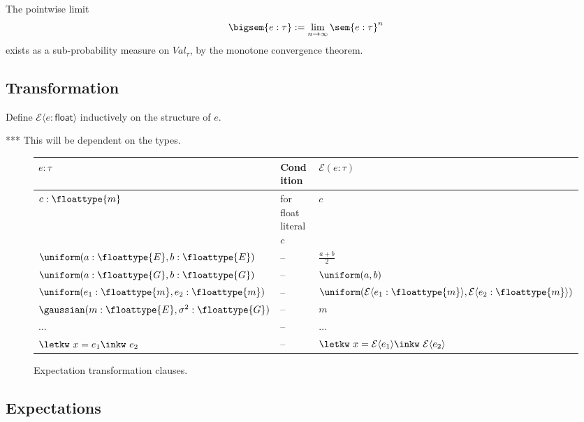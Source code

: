 \begin{lemma}
  The pointwise limit
  \[
    \bigsem{e : \tau} := \lim_{n \to \infty} \sem{e : \tau}^n
  \]
  exists as a sub-probability measure on $Val_\tau$, by the monotone convergence theorem.
\end{lemma}

\subsection{Transformation}

\begin{definition}
  Define $\mathcal{E}\langle e : \mathsf{float} \rangle$ inductively on the structure of $e$.

  *** This will be dependent on the types.

  \begin{figure}[t]
    \footnotesize
    \centering
    \begin{tabular}{l|l|l}
      \textbf{$e:\tau$} & \textbf{Condition} & \textbf{$\mathcal{E}(e:\tau)$} \\
      \hline
      $c : \floattype{m}$ &
      for float literal $c$ &
      $c$ \\
      $\uniform(a : \floattype{E}, b : \floattype{E})$ &
      -- &
      $\tfrac{a+b}{2}$ \\
      $\uniform(a : \floattype{G}, b : \floattype{G})$ &
      -- &
      $\uniform(a, b)$ \\
      $\uniform(e_1 : \floattype{m}, e_2 : \floattype{m})$ &
      -- &
      $\uniform(\mathcal{E}\langle e_1 : \floattype{m} \rangle, \mathcal{E}\langle e_2 : \floattype{m} \rangle)$ \\
      $\gaussian(m : \floattype{E}, \sigma^2 : \floattype{G})$ &
      -- &
      $m$ \\
      $\ldots$ &
      -- &
      $\ldots$ \\
      $\letkw\ x = e_1 \inkw\ e_2$ &
      -- &
      $\letkw\ x = \mathcal{E}\langle e_1 \rangle \inkw\ \mathcal{E}\langle e_2 \rangle$
      \\
    \end{tabular}
    \caption{Expectation transformation clauses.}
    \label{fig:expectation-transformation}
  \end{figure}
\end{definition}


\subsection{Expectations}

